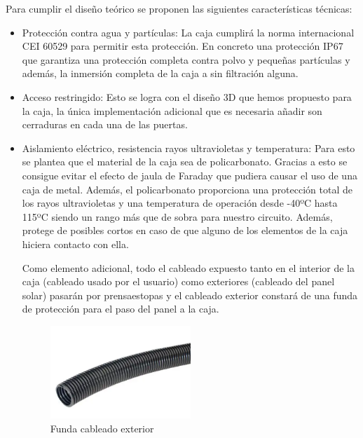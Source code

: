 Para cumplir el diseño teórico se proponen las siguientes características técnicas:
\begin{itemize}
    \item Protección contra agua y partículas: La caja cumplirá la norma internacional CEI 60529 para permitir esta protección. En concreto una protección IP67 que garantiza una protección completa contra polvo y pequeñas partículas y además, la inmersión completa de la caja a sin filtración alguna.\cite{iecInternationalStandardIEC}

    \item Acceso restringido: Esto se logra con el diseño 3D que hemos propuesto para la caja, la única implementación adicional que es necesaria añadir son cerraduras en cada una de las puertas.

    \item Aislamiento eléctrico, resistencia rayos ultravioletas y temperatura: Para esto se plantea que el material de la caja sea de policarbonato. Gracias a esto se consigue evitar el efecto de jaula de Faraday que pudiera causar el uso de una caja de metal. Además, el policarbonato proporciona una protección total de los rayos ultravioletas y una temperatura de operación desde -40ºC hasta 115ºC siendo un rango más que de sobra para nuestro circuito.\cite{horeshPolycarbonateProtectionUV2021} Además, protege de posibles cortos en caso de que alguno de los elementos de la caja hiciera contacto con ella.

    Como elemento adicional, todo el cableado expuesto tanto en el interior de la caja (cableado usado por el usuario) como exteriores (cableado del panel solar) pasarán por prensaestopas y el cableado exterior constará de una funda de protección para el paso del panel a la caja.
    \begin{figure}[H]
        \centering
        \includegraphics[width=0.5\textwidth]{images/4-DesarrolloTeorico/4-1-caja/CAJA_FUNDAS.png}
        \caption{Funda cableado exterior}
        \label{fig:DesarrolloTeorico/Caja/CAJA_FUNDA}
    \end{figure}


\end{itemize}

